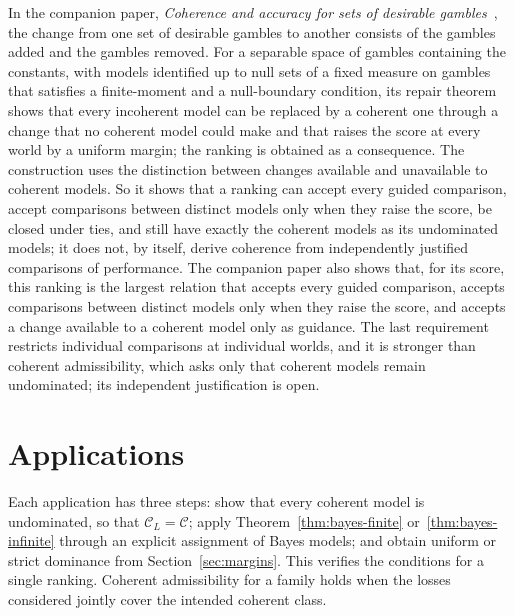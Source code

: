 \documentclass[11pt]{article}
\theoremstyle{definition}
\theoremstyle{remark}
\newcommand{\C}{\mathcal C}
\begin{document}
In the companion paper, \emph{Coherence and accuracy for sets of desirable gambles}~\cite{KCM}, the change from one set of desirable gambles to another consists of the gambles added and the gambles removed. For a separable space of gambles containing the constants, with models identified up to null sets of a fixed measure on gambles that satisfies a finite-moment and a null-boundary condition, its repair theorem shows that every incoherent model can be replaced by a coherent one through a change that no coherent model could make and that raises the score at every world by a uniform margin; the ranking is obtained as a consequence. The construction uses the distinction between changes available and unavailable to coherent models. So it shows that a ranking can accept every guided comparison, accept comparisons between distinct models only when they raise the score, be closed under ties, and still have exactly the coherent models as its undominated models; it does not, by itself, derive coherence from independently justified comparisons of performance. The companion paper also shows that, for its score, this ranking is the largest relation that accepts every guided comparison, accepts comparisons between distinct models only when they raise the score, and accepts a change available to a coherent model only as guidance. The last requirement restricts individual comparisons at individual worlds, and it is stronger than coherent admissibility, which asks only that coherent models remain undominated; its independent justification is open.

\section{Applications}\label{sec:apps}
Each application has three steps: show that every coherent model is undominated, so that $\C_L=\C$; apply Theorem~\ref{thm:bayes-finite} or~\ref{thm:bayes-infinite} through an explicit assignment of Bayes models; and obtain uniform or strict dominance from Section~\ref{sec:margins}. This verifies the conditions for a single ranking. Coherent admissibility for a family holds when the losses considered jointly cover the intended coherent class.
\end{document}
